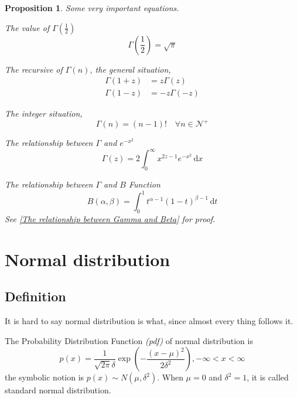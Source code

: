 \documentclass[a4paper]{article}
\newtheorem{proposition}{Proposition}[section]
\begin{document}
\begin{proposition} \label{Gamma function propositions}
    Some very important equations.

    The value of $\Gamma(\frac{1}{2})$
    \begin{equation*}
        \Gamma(\frac{1}{2}) = \sqrt {\pi}
    \end{equation*}

    The recursive of $\Gamma(n)$, the general situation,
    \begin{equation*}
        \begin{aligned}
            \Gamma(1+z) & = z \Gamma(z)   \\
            \Gamma(1-z) & = -z \Gamma(-z)
        \end{aligned}
    \end{equation*}

    The integer situation,
    \begin{equation*}
        \Gamma(n) = (n-1)! \quad \forall n \in \mathcal{N}^+
    \end{equation*}

    The relationship between $\Gamma$ and $e^{-x^{2}}$
    \begin{equation*}
        \Gamma(z) = 2 \int_{0}^{\infty} x^{2z-1} e^{-x^{2}} \,\mathrm{d}x
    \end{equation*}

    The relationship between $\Gamma$ and $B$ Function
    \begin{equation*}
        B(\alpha, \beta) = \int_{0}^{1} t^{\alpha-1} (1-t)^{\beta-1} \,\mathrm{d}t
    \end{equation*}
    See \ref{The relationship between Gamma and Beta} for proof.

\end{proposition}

\section{Normal distribution}

\subsection{Definition}
It is hard to say normal distribution is what, since almost every thing follows it.

The Probability Distribution Function \emph{(pdf)} of normal distribution is
\begin{equation}
    p(x) = \frac{1}{\sqrt{2\pi}\delta} \exp({-\frac{(x-\mu)^2}{2\delta^2}}), -\infty < x < \infty
\end{equation}
the symbolic notion is $p(x) \sim N(\mu, \delta^2)$.
When $\mu = 0$ and $\delta^2 = 1$, it is called standard normal distribution.
\end{document}
